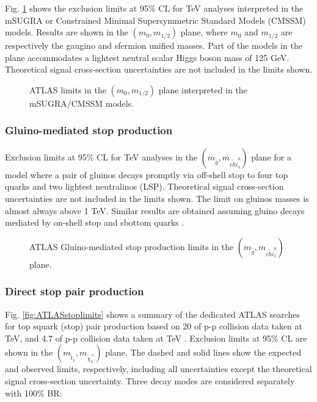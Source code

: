 Fig. \ref{fig:ATLASmsugralimits} shows the exclusion limits at 95\% CL for \cmotto TeV analyses interpreted in the mSUGRA or Constrained Minimal Supersymmetric Standard Models (CMSSM) models. Results are shown in the $(m_0, m_{1/2})$ plane, where  $m_0$ and $m_{1/2}$ are respectively the gaugino and sfermion unified masses. Part of the models in the plane accommodates a lightest neutral scalar Higgs boson mass of 125 GeV. Theoretical signal cross-section uncertainties are not included in the limits shown. 
\begin{figure}[h]
\begin{center}
\end{center}
\caption[ATLAS mSUGRA/CMSSM limits]{ATLAS limits in the $(m_0, m_{1/2})$ plane interpreted in the mSUGRA/CMSSM models.}
\label{fig:ATLASmsugralimits}
\end{figure}

\subsubsection{Gluino-mediated stop production}

Exclusion limits at 95\% CL for \cmotto TeV analyses in the $(m_{\tilde{g}}, m_{\tilde{chi}_1^0})$ plane for a model where a pair of gluinos decays promptly via off-shell stop to four top quarks and two lightest neutralinos (LSP). Theoretical signal cross-section uncertainties are not included in the limits shown. The limit on gluinos masses is almost always above 1 TeV. Similar results are obtained assuming gluino decays mediated by on-shell stop and sbottom quarks \cite{atlas:strong1} \cite{atlas:strong2}.


\begin{figure}[h]
\begin{center}
\end{center}
\caption[ATLAS Gluino-mediated stop production limits]{ATLAS Gluino-mediated stop production limits in the $(m_{\tilde{g}}, m_{\tilde{chi}_1^0})$ plane.}
\label{fig:ATLASgluinolimits}
\end{figure}

\subsubsection{Direct stop pair production}

Fig. \ref{fig:ATLASstoplimits} shows a summary of the dedicated ATLAS searches for top squark (stop) pair production based on 20 \ifb of p-p collision data taken at \cmotto TeV, and 4.7 \ifb of p-p collision data taken at \cmotto TeV \cite{atlas:stop0lep} \cite{atlas:stop2lep}. Exclusion limits at 95\% CL are shown in the $\left( m_{\tilde{t}_1}, m_{\tilde{\chi}^+_1} \right)$ plane. The dashed and solid lines show the expected and observed limits, respectively, including all uncertainties except the theoretical signal cross-section uncertainty. Three decay modes are considered separately with 100\% BR: 

